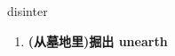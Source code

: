 
\begin{frame}
{\huge disinter}
\begin{center}
\begin{enumerate}\Large
  \item \textbf{(从墓地里)掘出 unearth}
\end{enumerate}
\end{center}
\end{frame}

